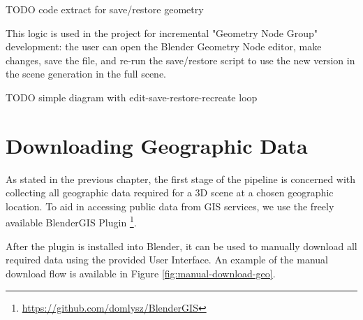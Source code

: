 TODO code extract for save/restore geometry

This logic is used in the project for incremental "Geometry Node Group" development: the user can open the Blender Geometry Node editor, make changes, save the file, and re-run the save/restore script to use the new version in the scene generation in the full scene.

TODO simple diagram with edit-save-restore-recreate loop


\section{Downloading Geographic Data}
\label{sec:dowonload-geo-data}

As stated in the previous chapter, the first stage of the pipeline is concerned with collecting all geographic data required for a 3D scene at a chosen geographic location. To aid in accessing public data from GIS services, we use the freely available BlenderGIS Plugin \footnote{\url{https://github.com/domlysz/BlenderGIS}}.

After the plugin is installed into Blender, it can be used to manually download all required data using the provided User Interface. An example of the manual download flow is available in Figure \ref{fig:manual-download-geo}.

